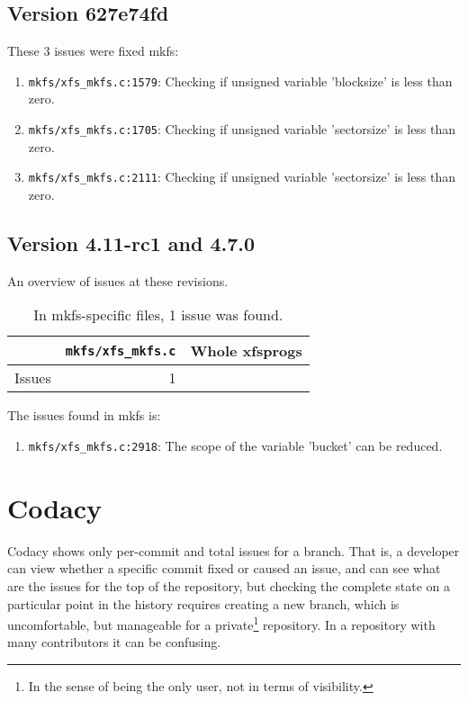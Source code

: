 \subsection{Version 627e74fd}
These 3 issues were fixed mkfs:
\begin{enumerate}
	\item {\tt mkfs/xfs\_mkfs.c:1579}: Checking if unsigned variable 'blocksize' is less than zero.
	\item {\tt mkfs/xfs\_mkfs.c:1705}: Checking if unsigned variable
		'sectorsize' is less than zero.
	\item {\tt mkfs/xfs\_mkfs.c:2111}: Checking if unsigned variable
		'sectorsize' is less than zero.
\end{enumerate}

\subsection{Version 4.11-rc1 and 4.7.0}
An overview of issues at these revisions.
\begin{table}[h]
\begin{tabular}{|l||r||r|}
\hline
& {\tt mkfs/xfs\_mkfs.c} & Whole xfsprogs \\
\hline
Issues & 1 &  \\
\hline
\end{tabular}
\caption{In mkfs-specific files, 1 issue was found.}
\end{table}

The issues found in mkfs is:
\begin{enumerate}
	\item {\tt mkfs/xfs\_mkfs.c:2918}: The scope of the variable 'bucket' can be reduced.
\end{enumerate}



\section{Codacy}\label{chap:results:codacy}
Codacy shows only per-commit and total issues for a branch. That is, a
developer can view whether a specific commit fixed or caused an issue, and
can see what are the issues for the top of the repository, but checking the
complete state on a particular point in the history requires creating a new
branch, which is uncomfortable, but manageable for a private\footnote{In
the sense of being the only user, not in terms of visibility.} repository.
In a repository with many contributors it can be confusing.

